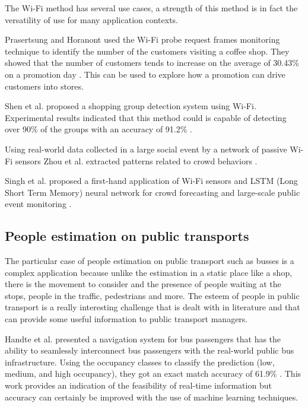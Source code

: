 The Wi-Fi method has several use cases, a strength of this method is in fact the versatility of use for many application contexts.

Prasertsung and Horanont used the Wi-Fi probe request frames monitoring technique to identify the number of the customers visiting a coffee shop. They showed that the number of customers tends to increase on the average of 30.43\% on a promotion day \cite{prasertsung2017does}. This can be used to explore how a promotion can drive customers into stores.

Shen et al. proposed a shopping group detection system using Wi-Fi. Experimental results indicated that this method could is capable of detecting over 90\% of the groups with an accuracy of 91.2\% \cite{shen2018snow}.

Using real-world data collected in a large social event by a network of passive Wi-Fi sensors Zhou et al. extracted patterns related to crowd behaviors \cite{zhou2020understanding}.

Singh et al. proposed a first-hand application of Wi-Fi sensors and LSTM (Long Short Term Memory) neural network for crowd forecasting and large-scale public event monitoring \cite{singh2020crowd}.


\vspace{0.1 cm}
\subsection{People estimation on public transports}
\label{sec:transports}
\vspace{0.1 cm}

The particular case of people estimation on public transport such as busses is a complex application because unlike the estimation in a static place like a shop, there is the movement to consider and the presence of people waiting at the stops, people in the traffic, pedestrians and more. The esteem of people in public transport is a really interesting challenge that is dealt with in literature and that can provide some useful information to public transport managers.

Handte et al. presented a navigation system for bus passengers that has the ability to seamlessly interconnect bus passengers with the real-world public bus infrastructure. Using the occupancy classes to classify the prediction (low, medium, and high occupancy), they got an exact match accuracy of 61.9\% \cite{handte2016internet}. This work provides an indication of the feasibility of real-time information but accuracy can certainly be improved with the use of machine learning techniques.

